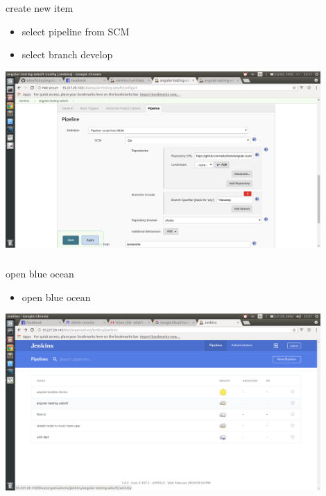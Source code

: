 \documentclass{beamer}
\begin{document}
\begin{frame}\frametitle{} 

\begin{block}{create new item}
\begin{itemize}
\item select pipeline from SCM
\item select branch develop
\end{itemize}
\end{block}


\begin{center}
\includegraphics[width=0.9\textwidth]{jenkins-pipeline.png}
\end{center}

\end{frame}


\begin{frame}\frametitle{} 

\begin{block}{open blue ocean}
\begin{itemize}
\item open blue ocean
\end{itemize}
\end{block}


\begin{center}
\includegraphics[width=0.9\textwidth]{jenkins-blue-ocean.png}
\end{center}

\end{frame}
\end{document}
